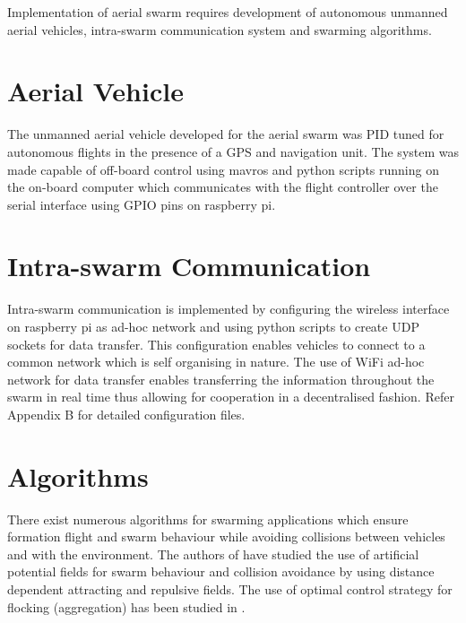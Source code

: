 \begin{spacing}{2}
Implementation of aerial swarm requires development of autonomous unmanned aerial vehicles, intra-swarm communication system and swarming algorithms.
\section{Aerial Vehicle}
The unmanned aerial vehicle developed for the aerial swarm was PID tuned for autonomous flights in the presence of a GPS and navigation unit. The system was made capable of off-board control using mavros and python scripts running on the on-board computer which communicates with the flight controller over the serial interface using GPIO pins on raspberry pi.

\section{Intra-swarm Communication}
Intra-swarm communication is implemented by configuring the wireless interface on raspberry pi as ad-hoc network and using python scripts to create UDP sockets for data transfer. This configuration enables vehicles to connect to a common network which is self organising in nature. The use of WiFi ad-hoc network for data transfer enables transferring the information throughout the swarm in real time thus allowing for cooperation in a decentralised fashion. Refer Appendix B for detailed configuration files.

\section{Algorithms}
There exist numerous algorithms for swarming applications which ensure formation flight and swarm behaviour while avoiding collisions between vehicles and with the environment. The authors of \cite{kim2006decentralized} have studied the use of artificial potential fields for swarm behaviour and collision avoidance by using distance dependent attracting and repulsive fields. The use of optimal control strategy for flocking (aggregation) has been studied in \cite{saif2014flocking}.

\end{spacing}
